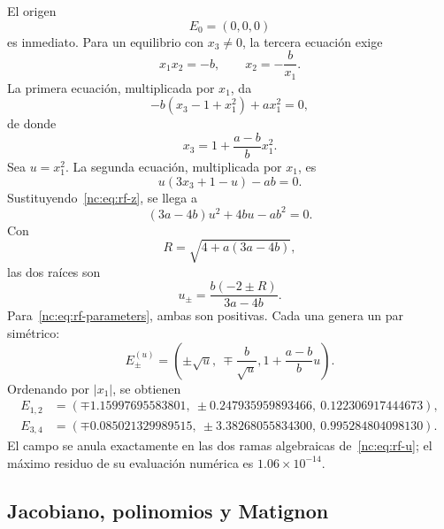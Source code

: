 El origen
\begin{equation}
 E_0=(0,0,0)
\end{equation}
es inmediato. Para un equilibrio con \(x_3\neq0\), la tercera ecuación exige
\begin{equation}
 x_1x_2=-b,\qquad x_2=-\frac{b}{x_1}.
 \label{nc:eq:rf-product}
\end{equation}
La primera ecuación, multiplicada por \(x_1\), da
\begin{equation}
 -b(x_3-1+x_1^2)+a x_1^2=0,
\end{equation}
de donde
\begin{equation}
 x_3=1+\frac{a-b}{b}x_1^2.
 \label{nc:eq:rf-z}
\end{equation}
Sea \(u=x_1^2\). La segunda ecuación, multiplicada por \(x_1\), es
\begin{equation}
 u(3x_3+1-u)-ab=0.
\end{equation}
Sustituyendo~\eqref{nc:eq:rf-z}, se llega a
\begin{equation}
 (3a-4b)u^2+4bu-ab^2=0.
 \label{nc:eq:rf-u-polynomial}
\end{equation}
Con
\begin{equation}
 R=\sqrt{4+a(3a-4b)},
\end{equation}
las dos raíces son
\begin{equation}
 u_{\pm}=\frac{b(-2\pm R)}{3a-4b}.
 \label{nc:eq:rf-u}
\end{equation}
Para~\eqref{nc:eq:rf-parameters}, ambas son positivas. Cada una genera un par
simétrico:
\begin{equation}
 E_{\pm}^{(u)}=\left(
 \pm\sqrt u,\ \mp\frac{b}{\sqrt u},
 1+\frac{a-b}{b}u
 \right).
 \label{nc:eq:rf-equilibria-general}
\end{equation}
Ordenando por \(|x_1|\), se obtienen
\begin{align}
 E_{1,2}&=(\mp1.15997695583801,
 \ \pm0.247935959893466,
 \ 0.122306917444673),
 \label{nc:eq:rf-e12}\\
 E_{3,4}&=(\mp0.085021329989515,
 \ \pm3.38268055834300,
 \ 0.995284804098130).
 \label{nc:eq:rf-e34}
\end{align}
El campo se anula exactamente en las dos ramas
algebraicas de~\eqref{nc:eq:rf-u}; el máximo residuo de su evaluación numérica es
\(1.06\times10^{-14}\).

\subsection{Jacobiano, polinomios y Matignon}


